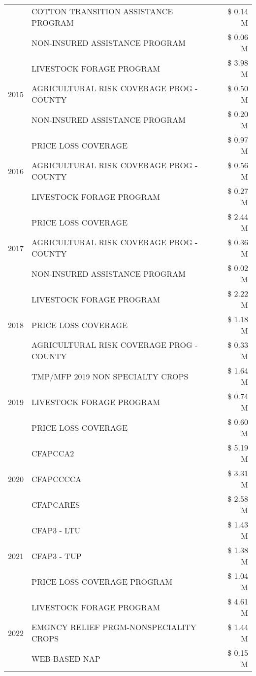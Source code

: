 \begin{tabular}{llr}
 & COTTON TRANSITION ASSISTANCE PROGRAM & \$ 0.14 M \\
 & NON-INSURED ASSISTANCE PROGRAM & \$ 0.06 M \\
\cline{1-3}
\multirow[t]{3}{*}{2015} & LIVESTOCK FORAGE PROGRAM & \$ 3.98 M \\
 & AGRICULTURAL RISK COVERAGE PROG - COUNTY & \$ 0.50 M \\
 & NON-INSURED ASSISTANCE PROGRAM & \$ 0.20 M \\
\cline{1-3}
\multirow[t]{3}{*}{2016} & PRICE LOSS COVERAGE & \$ 0.97 M \\
 & AGRICULTURAL RISK COVERAGE PROG - COUNTY & \$ 0.56 M \\
 & LIVESTOCK FORAGE PROGRAM & \$ 0.27 M \\
\cline{1-3}
\multirow[t]{3}{*}{2017} & PRICE LOSS COVERAGE & \$ 2.44 M \\
 & AGRICULTURAL RISK COVERAGE PROG - COUNTY & \$ 0.36 M \\
 & NON-INSURED ASSISTANCE PROGRAM & \$ 0.02 M \\
\cline{1-3}
\multirow[t]{3}{*}{2018} & LIVESTOCK FORAGE PROGRAM & \$ 2.22 M \\
 & PRICE LOSS COVERAGE & \$ 1.18 M \\
 & AGRICULTURAL RISK COVERAGE PROG - COUNTY & \$ 0.33 M \\
\cline{1-3}
\multirow[t]{3}{*}{2019} & TMP/MFP 2019 NON SPECIALTY CROPS & \$ 1.64 M \\
 & LIVESTOCK FORAGE PROGRAM & \$ 0.74 M \\
 & PRICE LOSS COVERAGE & \$ 0.60 M \\
\cline{1-3}
\multirow[t]{3}{*}{2020} & CFAPCCA2 & \$ 5.19 M \\
 & CFAPCCCCA & \$ 3.31 M \\
 & CFAPCARES & \$ 2.58 M \\
\cline{1-3}
\multirow[t]{3}{*}{2021} & CFAP3 - LTU & \$ 1.43 M \\
 & CFAP3 - TUP & \$ 1.38 M \\
 & PRICE LOSS COVERAGE PROGRAM & \$ 1.04 M \\
\cline{1-3}
\multirow[t]{3}{*}{2022} & LIVESTOCK FORAGE PROGRAM & \$ 4.61 M \\
 & EMGNCY RELIEF PRGM-NONSPECIALITY CROPS & \$ 1.44 M \\
 & WEB-BASED NAP & \$ 0.15 M \\
\cline{1-3}
\bottomrule
\end{tabular}
